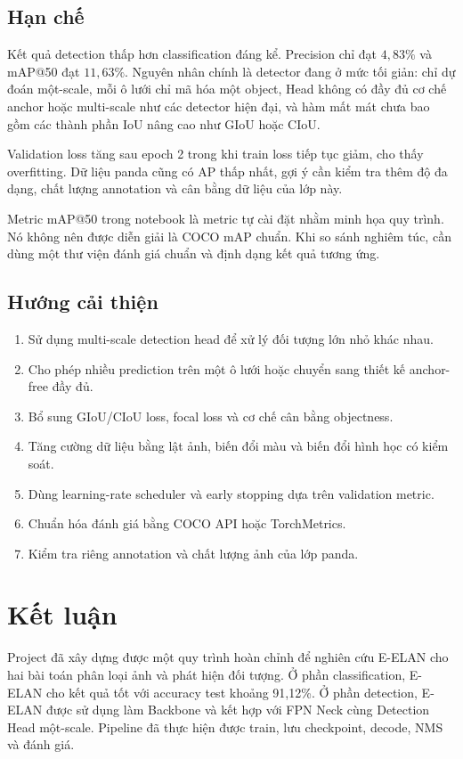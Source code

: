 \documentclass[12pt,a4paper]{article}
\newcommand{\classaccuracy}{91,12\%}
\begin{document}
\subsection{Hạn chế}

Kết quả detection thấp hơn classification đáng kể. Precision chỉ đạt $4,83\%$ và mAP@50 đạt $11,63\%$. Nguyên nhân chính là detector đang ở mức tối giản: chỉ dự đoán một-scale, mỗi ô lưới chỉ mã hóa một object, Head không có đầy đủ cơ chế anchor hoặc multi-scale như các detector hiện đại, và hàm mất mát chưa bao gồm các thành phần IoU nâng cao như GIoU hoặc CIoU.

Validation loss tăng sau epoch 2 trong khi train loss tiếp tục giảm, cho thấy overfitting. Dữ liệu panda cũng có AP thấp nhất, gợi ý cần kiểm tra thêm độ đa dạng, chất lượng annotation và cân bằng dữ liệu của lớp này.

Metric mAP@50 trong notebook là metric tự cài đặt nhằm minh họa quy trình. Nó không nên được diễn giải là COCO mAP chuẩn. Khi so sánh nghiêm túc, cần dùng một thư viện đánh giá chuẩn và định dạng kết quả tương ứng.

\subsection{Hướng cải thiện}
\begin{enumerate}[leftmargin=*]
  \item Sử dụng multi-scale detection head để xử lý đối tượng lớn nhỏ khác nhau.
  \item Cho phép nhiều prediction trên một ô lưới hoặc chuyển sang thiết kế anchor-free đầy đủ.
  \item Bổ sung GIoU/CIoU loss, focal loss và cơ chế cân bằng objectness.
  \item Tăng cường dữ liệu bằng lật ảnh, biến đổi màu và biến đổi hình học có kiểm soát.
  \item Dùng learning-rate scheduler và early stopping dựa trên validation metric.
  \item Chuẩn hóa đánh giá bằng COCO API hoặc TorchMetrics.
  \item Kiểm tra riêng annotation và chất lượng ảnh của lớp panda.
\end{enumerate}

\section{Kết luận}

Project đã xây dựng được một quy trình hoàn chỉnh để nghiên cứu E-ELAN cho hai bài toán phân loại ảnh và phát hiện đối tượng. Ở phần classification, E-ELAN cho kết quả tốt với accuracy test khoảng \classaccuracy. Ở phần detection, E-ELAN được sử dụng làm Backbone và kết hợp với FPN Neck cùng Detection Head một-scale. Pipeline đã thực hiện được train, lưu checkpoint, decode, NMS và đánh giá.
\end{document}
